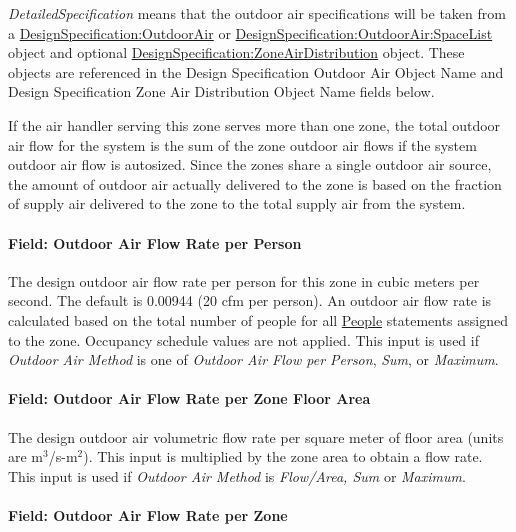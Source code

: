 \emph{DetailedSpecification} means that the outdoor air specifications will be taken from a \hyperref[designspecificationoutdoorair]{DesignSpecification:OutdoorAir} or \hyperref[designspecificationoutdoorairspacelist]{DesignSpecification:OutdoorAir:SpaceList} object and optional \hyperref[designspecificationzoneairdistribution]{DesignSpecification:ZoneAirDistribution} object. These objects are referenced in the Design Specification Outdoor Air Object Name and Design Specification Zone Air Distribution Object Name fields below.

If the air handler serving this zone serves more than one zone, the total outdoor air flow for the system is the sum of the zone outdoor air flows if the system outdoor air flow is autosized. Since the zones share a single outdoor air source, the amount of outdoor air actually delivered to the zone is based on the fraction of supply air delivered to the zone to the total supply air from the system.

\paragraph{Field: Outdoor Air Flow Rate per Person}\label{field-outdoor-air-flow-rate-per-person-11}

The design outdoor air flow rate per person for this zone in cubic meters per second. The default is 0.00944 (20 cfm per person). An outdoor air flow rate is calculated based on the total number of people for all \hyperref[people]{People} statements assigned to the zone. Occupancy schedule values are not applied. This input is used if \emph{Outdoor Air Method} is one of \emph{Outdoor Air Flow per Person}, \emph{Sum}, or \emph{Maximum}.

\paragraph{Field: Outdoor Air Flow Rate per Zone Floor Area}\label{field-outdoor-air-flow-rate-per-zone-floor-area-11}

The design outdoor air volumetric flow rate per square meter of floor area (units are m\(^{3}\)/s-m\(^{2}\)). This input is multiplied by the zone area to obtain a flow rate. This input is used if \emph{Outdoor Air Method} is \emph{Flow/Area, Sum} or \emph{Maximum}.

\paragraph{Field: Outdoor Air Flow Rate per Zone}\label{field-outdoor-air-flow-rate-per-zone-11}

